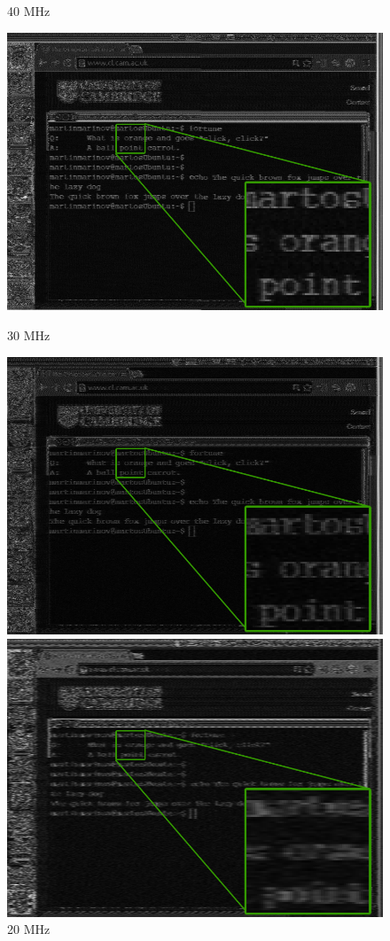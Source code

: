 \documentclass[a4paper,12pt,twoside,openright]{report}
\begin{document}
{{{{{\begin{figure}[h!]
  \caption{40 MHz}
\endminipage\hfill
{}
  \centering
    \includegraphics[width=\linewidth]{sr_30MHz_at_190MHz}
  \caption{30 MHz}
\endminipage\hfill
{}
  \centering
    \includegraphics[width=\linewidth]{sr_20MHz_at_190MHz}
  \caption{20 MHz}
\endminipage\hfill
{}
  \centering
    \includegraphics[width=\linewidth]{sr_10MHz_at_190MHz}

\end{figure}}}}}}
\end{document}
